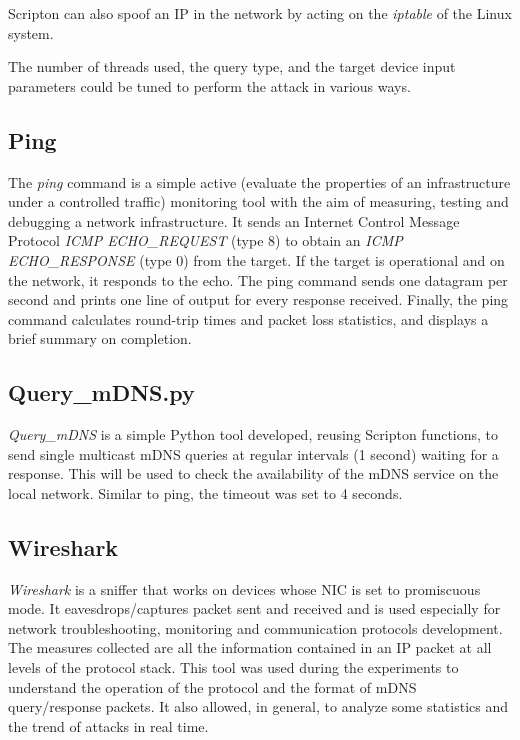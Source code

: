 \documentclass[fleqn, 11pt]{SelfArx} %
\begin{document}
Scripton can also spoof an IP in the network by acting on the \textit{iptable} of the Linux system.

The number of threads used, the query type, and the target device input parameters could be tuned to perform the attack in various ways.

\subsection{Ping}
The \textit {ping} \cite{pingManPage} command is a simple active (evaluate the properties of an infrastructure under a controlled traffic) monitoring tool with the aim of measuring, testing and debugging a network infrastructure. It sends an Internet Control Message Protocol \textit{ICMP ECHO\_REQUEST} (type 8) to obtain an \textit{ICMP ECHO\_RESPONSE} (type 0) from the target. If the target is operational and on the network, it responds to the echo. The ping command sends one datagram per second and prints one line of output for every response received. Finally, the ping command calculates round-trip times and packet loss statistics, and displays a brief summary on completion.

\subsection{Query\_mDNS.py}
\label{sec:query-mdns-script}
\textit{Query\_mDNS} is a simple Python tool developed, reusing Scripton functions, to send single multicast mDNS queries at regular intervals (1 second) waiting for a response. This will be used to check the availability of the mDNS service on the local network.\newline
Similar to ping, the timeout was set to 4 seconds.

\subsection{Wireshark}
\textit{Wireshark} is a sniffer that works on devices whose NIC is set to promiscuous mode. It eavesdrops/captures packet sent and received and is used especially for network troubleshooting, monitoring and communication protocols development. The measures collected are all the information contained in an IP packet at all levels of the protocol stack. \newline
This tool was used during the experiments to understand the operation of the protocol and the format of mDNS query/response packets. \newline
It also allowed, in general, to analyze some statistics and the trend of attacks in real time.\newline
\end{document}
